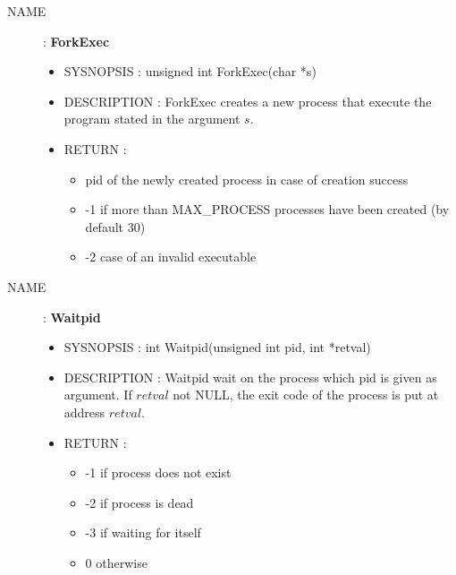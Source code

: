 \documentclass[a4paper,10pt]{article}
\begin{document}
\begin{description}
    \item [NAME] : \textbf{ForkExec}
        \begin{itemize}
            \item SYSNOPSIS : unsigned int ForkExec(char *s)
            \item DESCRIPTION :
                ForkExec creates a new process that execute the program stated in the argument $s$.
            \item RETURN :
                \begin{itemize}
                    \item pid of the newly created process in case of creation success
                    \item -1 if more than MAX\_PROCESS processes have been created (by default 30)
                    \item -2 case of an invalid executable
                \end{itemize}
        \end{itemize}

    \item [NAME] : \textbf{Waitpid}
        \begin{itemize}
            \item SYSNOPSIS : int Waitpid(unsigned int pid, int *retval)
            \item DESCRIPTION :
                Waitpid wait on the process which pid is given as argument.
                If $retval$ not NULL, the exit code of the process is put at address $retval$.
            \item RETURN :
                \begin{itemize}
                    \item -1 if process does not exist
                    \item -2 if process is dead
                    \item -3 if waiting for itself
                    \item 0 otherwise
                \end{itemize}
        \end{itemize}


\end{description}
\end{document}
